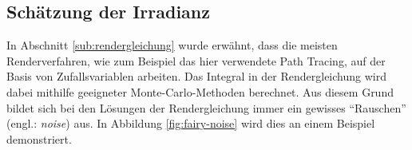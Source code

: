



	\subsection{Schätzung der Irradianz} %
	\label{sub:schaetzung_der_irradianz}

		In Abschnitt \ref{sub:rendergleichung} wurde erwähnt, dass die meisten Renderverfahren, wie zum Beispiel das hier verwendete Path Tracing, auf der Basis von Zufallsvariablen arbeiten.
		Das Integral in der Rendergleichung wird dabei mithilfe geeigneter Monte-Carlo-Methoden berechnet.
		Aus diesem Grund bildet sich bei den Lösungen der Rendergleichung immer ein gewisses \enquote{Rauschen} (engl.: \textit{noise}) aus.
		In Abbildung \ref{fig:fairy-noise} wird dies an einem Beispiel demonstriert.

